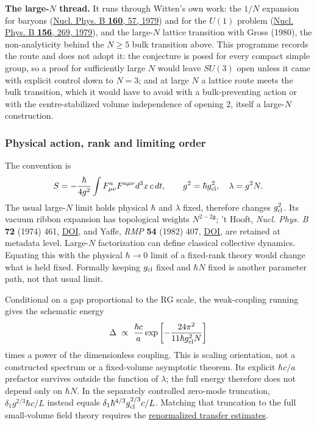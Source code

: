 \documentclass[11pt,a4paper]{article}
\begin{document}
\textbf{The large-\(N\) thread.} It runs through Witten's own work: the
\(1/N\) expansion for baryons
(\href{https://doi.org/10.1016/0550-3213(79)90232-3}{Nucl. Phys. B
\textbf{160}, 57, 1979}) and for the \(U(1)\) problem
(\href{https://doi.org/10.1016/0550-3213(79)90031-2}{Nucl. Phys. B
\textbf{156}, 269, 1979}), and the large-\(N\) lattice transition with
Gross (1980), the non-analyticity behind the \(N\ge5\) bulk transition
above. This programme records the route and does not adopt it: the
conjecture is posed for every compact simple group, so a proof for
sufficiently large \(N\) would leave \(SU(3)\) open unless it came with
explicit control down to \(N=3\); and at large \(N\) a lattice route
meets the bulk transition, which it would have to avoid with a
bulk-preventing action or with the centre-stabilized volume independence
of opening 2, itself a large-\(N\) construction.

\hypertarget{physical-action-rank-and-limiting-order}{%
\subsubsection{Physical action, rank and limiting
order}\label{physical-action-rank-and-limiting-order}}

The convention is
\[S=-\frac{\hbar}{4g^2}\int F^a_{\mu\nu}F^{a\mu\nu}d^3x\,c\,dt,
 \qquad g^2=\hbar g_{\rm cl}^2,\quad \lambda=g^2N.\] The usual
large-\(N\) limit holds physical \(\hbar\) and \(\lambda\) fixed,
therefore changes \(g_{\rm cl}^2\). Its vacuum ribbon expansion has
topological weights \(N^{2-2\mathfrak g}\); 't Hooft, \emph{Nucl. Phys.
B} \textbf{72} (1974) 461,
\href{https://doi.org/10.1016/0550-3213(74)90154-0}{DOI}, and Yaffe,
\emph{RMP} \textbf{54} (1982) 407,
\href{https://doi.org/10.1103/RevModPhys.54.407}{DOI}, are retained at
metadata level. Large-\(N\) factorization can define classical
collective dynamics. Equating this with the physical \(\hbar\to0\) limit
of a fixed-rank theory would change what is held fixed. Formally keeping
\(g_{\rm cl}\) fixed and \(\hbar N\) fixed is another parameter path,
not that usual limit.

Conditional on a gap proportional to the RG scale, the weak-coupling
running gives the schematic energy \[\Delta\ \propto\ \frac{\hbar c}{a}
 \exp\left[-\frac{24\pi^2}{11\hbar g_{\rm cl}^2N}\right]\] times a power
of the dimensionless coupling. This is scaling orientation, not a
constructed spectrum or a fixed-volume asymptotic theorem. Its explicit
\(\hbar c/a\) prefactor survives outside the function of \(\lambda\);
the full energy therefore does not depend only on \(\hbar N\). In the
separately controlled zero-mode truncation, \(\delta_1g^{2/3}\hbar c/L\)
instead equals \(\delta_1\hbar^{4/3}g_{\rm cl}^{2/3}c/L\). Matching that
truncation to the full small-volume field theory requires the
\href{weak-coupling-feshbach-reduction.md}{renormalized transfer
estimates}.
\end{document}
